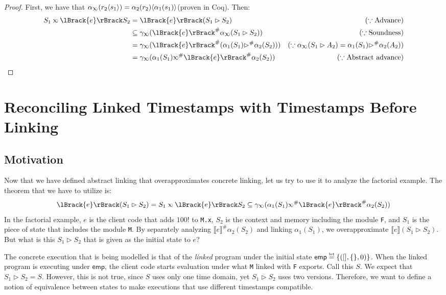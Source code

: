 \documentclass[acmsmall,screen,review]{acmart}\settopmatter{printfolios=true,printccs=false,printacmref=false}
\theoremstyle{acmdefinition}
\newcommand*{\Abs}[1]{{#1}^{\#}}
\newcommand*{\texteq}[1]{\stackrel{\mathclap{\tiny\normalfont\mbox{#1}}}{=}}
\newcommand*{\semlink}{\mathbin{\rotatebox[origin=c]{180}{$\propto$}}}
\newcommand*{\mt}{\mathsf{emp}}
\newcommand*{\sembracket}[1]{\lBrack{#1}\rBrack}
\newcommand*{\inject}[2]{{#2}\langle{#1}\rangle}
\begin{document}
\begin{proof}
  First, we have that $\alpha_{\semlink}(\inject{s_1}{r_2})=\inject{\alpha_1(s_1)}{\alpha_2(r_2)}$(proven in Coq). Then:
  \begin{align*}
    S_1\semlink\sembracket{e}S_2 & =\sembracket{e}(S_1\rhd S_2)                                                   & (\because\text{Advance})                                                    \\
                                 & \subseteq\gamma_{\semlink}(\Abs{\sembracket{e}}\alpha_{\semlink}(S_1\rhd S_2)) & (\because\text{Soundness})                                          \\
                                 & =\gamma_{\semlink}(\Abs{\sembracket{e}}(\alpha_1(S_1)\Abs\rhd\alpha_2(S_2)))   & (\because\alpha_{\semlink}(S_1\rhd A_2)=\alpha_1(S_1)\Abs\rhd\alpha_2(A_2)) \\
                                 & =\gamma_{\semlink}(\alpha_1(S_1)\Abs\semlink\Abs{\sembracket{e}}\alpha_2(S_2)) & (\because\text{Abstract advance})
  \end{align*}
\end{proof}
\section{Reconciling Linked Timestamps with Timestamps Before Linking}\label{sec:equiv}
\subsection{Motivation}
Now that we have defined abstract linking that overapproximates concrete linking, let us try to use it to analyze the factorial example.
The theorem that we have to utilize is:
\[\sembracket{e}(S_1\rhd S_2)=S_1\semlink\sembracket{e}S_2\subseteq\gamma_{\semlink}(\alpha_1(S_1)\Abs\semlink\Abs{\sembracket{e}}\alpha_2(S_2))\]
In the factorial example, $e$ is the client code that adds $100!$ to \texttt{M.x}, $S_2$ is the context and memory including the module \texttt{F}, and $S_1$ is the piece of state that includes the module \texttt{M}.
By separately analyzing $\Abs{\sembracket{e}}\alpha_2(S_2)$ and linking $\alpha_1(S_1)$, we overapproximate $\sembracket{e}(S_1\rhd S_2)$.
But what is this $S_1\rhd S_2$ that is given as the initial state to $e$?

The concrete execution that is being modelled is that of the \emph{linked} program under the initial state $\mt\texteq{let}\{([],\{\},0)\}$.
When the linked program is executing under $\mt$, the client code starts evaluation under what \texttt{M} linked with \texttt{F} exports.
Call this $S$.
We expect that $S_1\rhd S_2=S$.
However, this is not true, since $S$ uses only one time domain, yet $S_1\rhd S_2$ uses two versions.
Therefore, we want to define a notion of equivalence between states to make executions that use different timestamps compatible.
\end{document}
